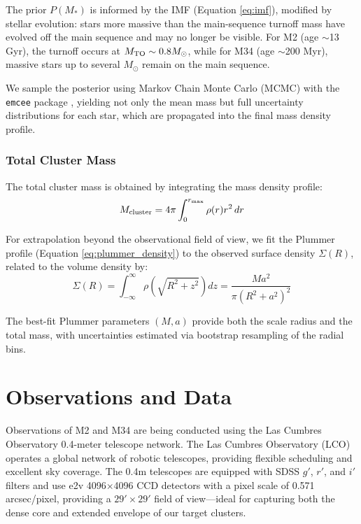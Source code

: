 \documentclass[linenumbers,trackchanges,twocolumn]{aastex701}
\begin{document}
The prior $P(M_*)$ is informed by the IMF (Equation \ref{eq:imf}), modified by stellar evolution: stars more massive than the main-sequence turnoff mass have evolved off the main sequence and may no longer be visible. For M2 (age $\sim$13 Gyr), the turnoff occurs at $M_{\rm TO} \sim 0.8 M_\odot$, while for M34 (age $\sim$200 Myr), massive stars up to several $M_\odot$ remain on the main sequence.

We sample the posterior using Markov Chain Monte Carlo (MCMC) with the \texttt{emcee} package \citep{2013PASP..125..306F}, yielding not only the mean mass but full uncertainty distributions for each star, which are propagated into the final mass density profile.

\subsubsection{Total Cluster Mass}

The total cluster mass is obtained by integrating the mass density profile:
\begin{equation}
M_{\rm cluster} = 4\pi \int_0^{r_{\rm max}} \rho(r) r^2 \, dr
\end{equation}

For extrapolation beyond the observational field of view, we fit the Plummer profile (Equation \ref{eq:plummer_density}) to the observed surface density $\Sigma(R)$, related to the volume density by:
\begin{equation}
\Sigma(R) = \int_{-\infty}^{\infty} \rho\left(\sqrt{R^2 + z^2}\right) dz = \frac{M a^2}{\pi (R^2 + a^2)^2}
\label{eq:plummer_surface}
\end{equation}

The best-fit Plummer parameters $(M, a)$ provide both the scale radius and the total mass, with uncertainties estimated via bootstrap resampling of the radial bins.


\section{Observations and Data} \label{sec:data}

Observations of M2 and M34 are being conducted using the Las Cumbres Observatory 0.4-meter telescope network. The Las Cumbres Observatory (LCO) operates a global network of robotic telescopes, providing flexible scheduling and excellent sky coverage. The 0.4m telescopes are equipped with SDSS $g'$, $r'$, and $i'$ filters and use e2v 4096$\times$4096 CCD detectors with a pixel scale of 0.571 arcsec/pixel, providing a $29' \times 29'$ field of view---ideal for capturing both the dense core and extended envelope of our target clusters.
\end{document}
